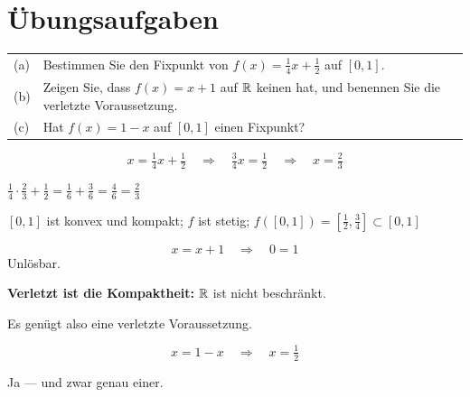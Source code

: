 \section{Übungsaufgaben}

\begin{aufgabe}
\begin{center}
{\small
\renewcommand{\arraystretch}{1.4}
\begin{tabular}{@{}P{0.8cm}P{7.6cm}@{}}
\toprule
(a) & Bestimmen Sie den Fixpunkt von $f(x) = \tfrac14 x + \tfrac12$ auf $[0,1]$.\\
(b) & Zeigen Sie, dass $f(x) = x+1$ auf $\mathbb{R}$ keinen hat, und benennen Sie die verletzte Voraussetzung.\\
(c) & Hat $f(x) = 1-x$ auf $[0,1]$ einen Fixpunkt?\\
\bottomrule
\end{tabular}}
\end{center}

\loesung
{}
\[ x = \tfrac14 x + \tfrac12 \quad\Longrightarrow\quad \tfrac34 x = \tfrac12 \quad\Longrightarrow\quad x = \tfrac23 \]

 $\tfrac14\cdot\tfrac23 + \tfrac12 = \tfrac16 + \tfrac36 = \tfrac46 = \tfrac23$ \checkmark

 $[0,1]$ ist konvex und kompakt; $f$ ist stetig; $f([0,1]) = [\tfrac12,\tfrac34] \subset [0,1]$ \checkmark

\[ x = x+1 \quad\Longrightarrow\quad 0 = 1 \]
Unlösbar.

\begin{center}
\begin{minipage}{0.9\textwidth}
\textbf{Verletzt ist die Kompaktheit:} $\mathbb{R}$ ist nicht beschränkt.
\end{minipage}
\end{center}

 Es genügt also eine verletzte Voraussetzung.

\[ x = 1-x \quad\Longrightarrow\quad x = \tfrac12 \]

Ja --- und zwar genau einer.

\begin{center}
\begin{minipage}{0.88\textwidth}
\end{minipage}
\end{center}


\end{aufgabe}

